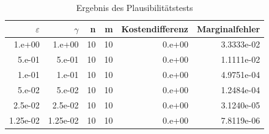 \begin{table}[htbp]
\caption{Ergebnis des Plausibilitätstests}
\label{tab:Plausibilitaetstest}
\small
\centering
{}
\begin{tabular}{rrrrrr}
\toprule
$\varepsilon$ & $\gamma$ & n & m & Kostendifferenz & Marginalfehler \\
\midrule
1.e+00 & 1.e+00 & 10 & 10 & 0.e+00 & 3.3333e-02 \\
5.e-01 & 5.e-01 & 10 & 10 & 0.e+00 & 1.1111e-02 \\
1.e-01 & 1.e-01 & 10 & 10 & 0.e+00 & 4.9751e-04 \\
5.e-02 & 5.e-02 & 10 & 10 & 0.e+00 & 1.2484e-04 \\
2.5e-02 & 2.5e-02 & 10 & 10 & 0.e+00 & 3.1240e-05 \\
1.25e-02 & 1.25e-02 & 10 & 10 & 0.e+00 & 7.8119e-06 \\
\bottomrule
\end{tabular}
\end{table}
